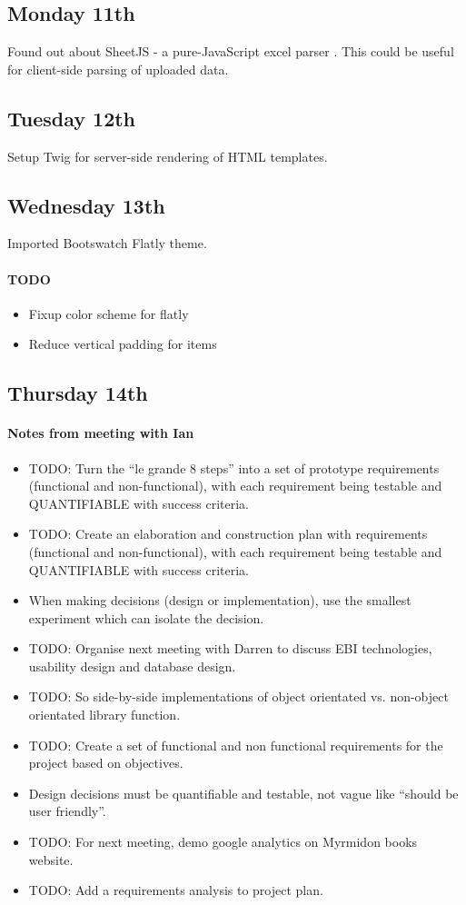 \subsection{Monday 11th}
Found out about SheetJS - a pure-JavaScript excel parser
\cite{SheetJS2013}. This could be useful for client-side parsing of uploaded
data.

\subsection{Tuesday 12th}
Setup Twig for server-side rendering of HTML templates.

\subsection{Wednesday 13th}
Imported Bootswatch Flatly theme.

\paragraph{TODO}
\begin{itemize}
\item Fixup color scheme for flatly
\item Reduce vertical padding for items
\end{itemize}

\subsection{Thursday 14th}
\paragraph{Notes from meeting with Ian}
\begin{itemize}
\item TODO: Turn the ``le grande 8 steps'' into a set of prototype requirements
  (functional and non-functional), with each requirement being testable and
  QUANTIFIABLE with success criteria.
\item TODO: Create an elaboration and construction plan with requirements
  (functional and non-functional), with each requirement being testable and
  QUANTIFIABLE with success criteria.
\item When making decisions (design or implementation), use the smallest
  experiment which can isolate the decision.
\item TODO: Organise next meeting with Darren to discuss EBI technologies,
  usability design and database design.
\item TODO: So side-by-side implementations of object orientated vs. non-object
  orientated library function.
\item TODO: Create a set of functional and non functional requirements for the
  project based on objectives.
\item Design decisions must be quantifiable and testable, not vague like
  ``should be user friendly''.
\item TODO: For next meeting, demo google analytics on Myrmidon books website.
\item TODO: Add a requirements analysis to project plan.
\end{itemize}

